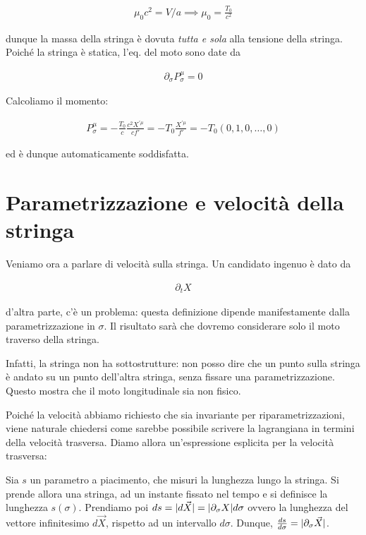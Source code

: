 \documentclass{report}
\begin{document}
{    \begin{align}
        \mu_0 c^2 = V/a \implies \mu_0 = \frac{T_0}{c^2}
    \end{align}

    dunque la massa della stringa è dovuta \emph{tutta e sola} alla tensione della stringa. Poiché la stringa è statica, l'eq. del moto sono date da 

    \begin{align}
        \partial_\sigma P^\mu_\sigma = 0 
    \end{align}

    Calcoliamo il momento: 

    \begin{align}
        P^\mu_\sigma = -\frac{T_0}{c}\frac{c^2X^{'\mu}}{cf'} = -T_0 \frac{X^{'\mu}}{f'} = -T_0 (0, 1, 0, \ldots, 0)
    \end{align}

    ed è dunque automaticamente soddisfatta. 
}

\section{Parametrizzazione e velocità della stringa}

Veniamo ora a parlare di velocità sulla stringa. Un candidato ingenuo è dato da 

\begin{align}
    \partial_t X
\end{align}

d'altra parte, c'è un problema: questa definizione dipende manifestamente dalla parametrizzazione in \(\sigma\). Il risultato sarà che dovremo considerare solo il moto traverso della stringa. 

Infatti, la stringa non ha sottostrutture: non posso dire che un punto sulla stringa è andato su un punto dell'altra stringa, senza fissare una parametrizzazione. Questo mostra che il moto longitudinale sia non fisico. 

Poiché la velocità abbiamo richiesto che sia invariante per riparametrizzazioni, viene naturale chiedersi come sarebbe possibile scrivere la lagrangiana in termini della velocità trasversa. Diamo allora un'espressione esplicita per la velocità trasversa: 

Sia \(s\) un parametro a piacimento, che misuri la lunghezza lungo la stringa. Si prende allora una stringa, ad un instante fissato nel tempo e si definisce la lunghezza \(s(\sigma)\). Prendiamo poi \(ds = \lvert d\vec{X}\rvert = \lvert\partial_\sigma X\rvert d\sigma\) ovvero la lunghezza del vettore infinitesimo \(d\vec{X}\), rispetto ad un intervallo \(d\sigma\). Dunque, \(\frac{ds}{d\sigma} = \lvert\partial_\sigma \vec{X}\rvert\). 
\end{document}
